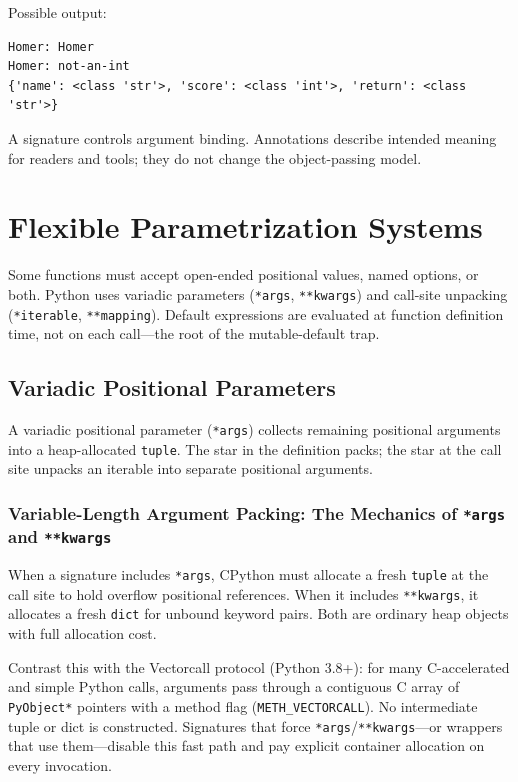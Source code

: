 \documentclass[a4paper,twoside]{report}
\begin{document}
Possible output:

\begin{verbatim}
Homer: Homer
Homer: not-an-int
{'name': <class 'str'>, 'score': <class 'int'>, 'return': <class 'str'>}
\end{verbatim}

A signature controls argument binding. Annotations describe intended meaning for readers and tools; they do not change the object-passing model.


\section{Flexible Parametrization Systems}

Some functions must accept open-ended positional values, named options, or both. Python uses variadic parameters (\texttt{*args}, \texttt{**kwargs}) and call-site unpacking (\texttt{*iterable}, \texttt{**mapping}). Default expressions are evaluated at function definition time, not on each call---the root of the mutable-default trap.


\subsection{Variadic Positional Parameters}

A variadic positional parameter (\texttt{*args}) collects remaining positional arguments into a heap-allocated \texttt{tuple}. The star in the definition packs; the star at the call site unpacks an iterable into separate positional arguments.

\subsubsection{Variable-Length Argument Packing: The Mechanics of \texttt{*args} and \texttt{**kwargs}}

When a signature includes \texttt{*args}, CPython must allocate a fresh \texttt{tuple} at the call site to hold overflow positional references. When it includes \texttt{**kwargs}, it allocates a fresh \texttt{dict} for unbound keyword pairs. Both are ordinary heap objects with full allocation cost.

Contrast this with the Vectorcall protocol (Python 3.8+): for many C-accelerated and simple Python calls, arguments pass through a contiguous C array of \texttt{PyObject*} pointers with a method flag (\texttt{METH\_VECTORCALL}). No intermediate tuple or dict is constructed. Signatures that force \texttt{*args}/\texttt{**kwargs}---or wrappers that use them---disable this fast path and pay explicit container allocation on every invocation.
\end{document}
